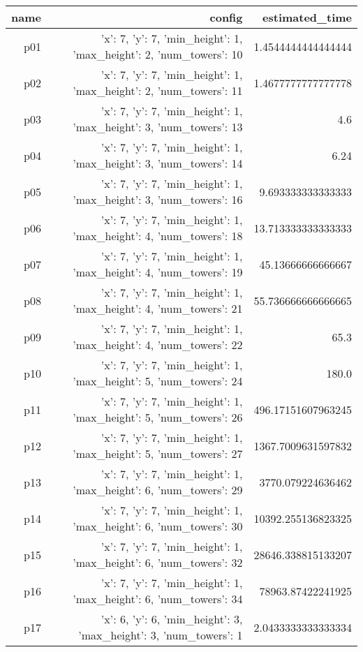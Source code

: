 \documentclass{article}
\begin{document}
                            \begin{center}
                            \scriptsize
                            \begin{tabular}{r|r|r}
                            name & config & estimated\_time\\\midrule
                              p01&{'x': 7, 'y': 7, 'min\_height': 1, 'max\_height': 2, 'num\_towers': 10}&1.4544444444444444\\
  p02&{'x': 7, 'y': 7, 'min\_height': 1, 'max\_height': 2, 'num\_towers': 11}&1.4677777777777778\\
  p03&{'x': 7, 'y': 7, 'min\_height': 1, 'max\_height': 3, 'num\_towers': 13}&4.6\\
  p04&{'x': 7, 'y': 7, 'min\_height': 1, 'max\_height': 3, 'num\_towers': 14}&6.24\\
  p05&{'x': 7, 'y': 7, 'min\_height': 1, 'max\_height': 3, 'num\_towers': 16}&9.693333333333333\\
  p06&{'x': 7, 'y': 7, 'min\_height': 1, 'max\_height': 4, 'num\_towers': 18}&13.713333333333333\\
  p07&{'x': 7, 'y': 7, 'min\_height': 1, 'max\_height': 4, 'num\_towers': 19}&45.13666666666667\\
  p08&{'x': 7, 'y': 7, 'min\_height': 1, 'max\_height': 4, 'num\_towers': 21}&55.736666666666665\\
  p09&{'x': 7, 'y': 7, 'min\_height': 1, 'max\_height': 4, 'num\_towers': 22}&65.3\\
  p10&{'x': 7, 'y': 7, 'min\_height': 1, 'max\_height': 5, 'num\_towers': 24}&180.0\\
  p11&{'x': 7, 'y': 7, 'min\_height': 1, 'max\_height': 5, 'num\_towers': 26}&496.17151607963245\\
  p12&{'x': 7, 'y': 7, 'min\_height': 1, 'max\_height': 5, 'num\_towers': 27}&1367.7009631597832\\
  p13&{'x': 7, 'y': 7, 'min\_height': 1, 'max\_height': 6, 'num\_towers': 29}&3770.079224636462\\
  p14&{'x': 7, 'y': 7, 'min\_height': 1, 'max\_height': 6, 'num\_towers': 30}&10392.255136823325\\
  p15&{'x': 7, 'y': 7, 'min\_height': 1, 'max\_height': 6, 'num\_towers': 32}&28646.338815133207\\
  p16&{'x': 7, 'y': 7, 'min\_height': 1, 'max\_height': 6, 'num\_towers': 34}&78963.87422241925\\
  p17&{'x': 6, 'y': 6, 'min\_height': 3, 'max\_height': 3, 'num\_towers': 1}&2.0433333333333334\\

\end{tabular}
\end{center}
\end{document}
